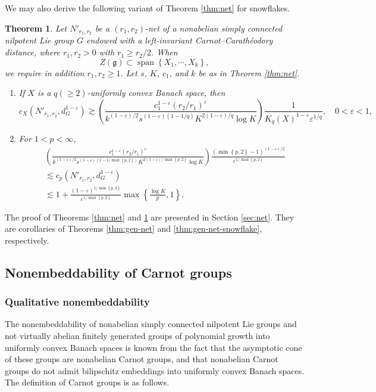 \documentclass[11pt,reqno]{amsart}
\newtheorem{theorem}{Theorem}
\newcommand{\1}{\mathbf 1}
\begin{document}
We may also derive the following variant of Theorem \ref{thm:net} for snowflakes.
\begin{theorem}\label{thm:net-snowflake}
Let $N'_{r_1,r_2}$ be a $\left(r_1,r_2\right)$-net of a nonabelian simply connected nilpotent Lie group $G$ endowed with a left-invariant Carnot--Carath\'eodory distance, where $r_1,r_2>0$ with $r_1\ge r_2/2$. When
\[
Z\left(\mathfrak{g}\right)\subset \operatorname{span}\left\{X_1,\cdots,X_k\right\},
\]
we require in addition $r_1,r_2\ge 1$. Let $s$, $K$, $c_1$, and $k$ be as in Theorem \ref{thm:net}.
\begin{enumerate}
    \item  If $X$ is a $q(\ge 2)$-uniformly convex Banach space, then
\[
c_X\left(N'_{r_1,r_2},d_G^{1-\varepsilon}\right)\gtrsim \left(\frac{c_1^{1-\varepsilon}\left(r_2/r_1\right)^{\varepsilon}}{k^{\left(1-\varepsilon\right)/2}s^{(1-\varepsilon)(1-1/q)} K^{2\left(1-\varepsilon\right)/q}\log K}\right)\frac{1}{K_q\left(X\right)^{1-\varepsilon}\varepsilon^{1/q}},\quad 0<\varepsilon<1,
\]
\item For $1<p<\infty$,
\begin{align*}
&\left(\frac{c_1^{1-\varepsilon}\left(r_2/r_1\right)^{\varepsilon}}{k^{\left(1-\varepsilon\right)/2}s^{(1-\varepsilon)(1-1/\max\left\{p,2\right\})} K^{2\left(1-\varepsilon\right)/\max\left\{p,2\right\}}\log K}\right)\frac{\left(\min\left\{p,2\right\}-1\right)^{(1-\varepsilon)/2}}{\varepsilon^{1/\max\left\{p,2\right\}}}\\
& \lesssim c_p\left(N'_{r_1,r_2},d_G^{1-\varepsilon}\right)\\
&\lesssim 1+\frac{(1-\varepsilon)^{1/\min\left\{p,2\right\}}}{\varepsilon^{1/\max\left\{p,2\right\}}}\max\left\{\frac{\log K}{p},1\right\}.
\end{align*}
\end{enumerate}
\end{theorem}

The proof of Theorems \ref{thm:net} and \ref{thm:net-snowflake} are presented in Section \ref{sec:net}. They are corollaries of Theorems \ref{thm:gen-net} and \ref{thm:gen-net-snowflake}, respectively.

\subsection{Nonembeddability of Carnot groups}\label{subsec:carnot}
\subsubsection{Qualitative nonembeddability}\label{subsubsec:carnot-qual}
The nonembeddability of nonabelian simply connected nilpotent Lie groups and not virtually abelian finitely generated groups of polynomial growth into uniformly convex Banach spaces is known from the fact that the asymptotic cone of these groups are nonabelian Carnot groups, and that nonabelian Carnot groups do not admit bilipschitz embeddings into uniformly convex Banach spaces. The definition of Carnot groups is as follows.
\end{document}
